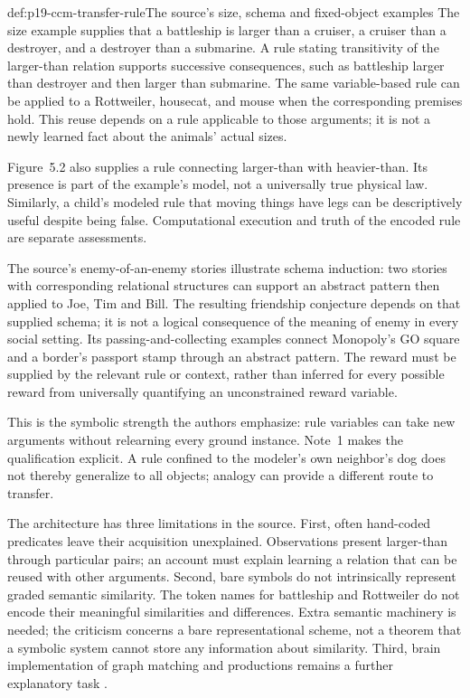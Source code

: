 \begin{hbexample}{def:p19-ccm-transfer-rule}{The source's size, schema and fixed-object examples}
The size example supplies that a battleship is larger than a cruiser,
a cruiser than a destroyer, and a destroyer than a submarine. A rule
stating transitivity of the larger-than relation supports successive
consequences, such as battleship larger than destroyer and then larger
than submarine. The same variable-based rule can be applied to a
Rottweiler, housecat, and mouse when the corresponding premises hold.
This reuse depends on a rule applicable to those arguments; it is not
a newly learned fact about the animals' actual sizes.

Figure~5.2 also supplies a rule connecting larger-than with heavier-than.
Its presence is part of the example's model, not a universally true
physical law. Similarly, a child's modeled rule that moving things have
legs can be descriptively useful despite being false. Computational
execution and truth of the encoded rule are separate assessments.

The source's enemy-of-an-enemy stories illustrate schema induction:
two stories with corresponding relational structures can support an
abstract pattern then applied to Joe, Tim and Bill. The resulting
friendship conjecture depends on that supplied schema; it is not a
logical consequence of the meaning of enemy in every social setting.
Its passing-and-collecting examples connect Monopoly's GO square and
a border's passport stamp through an abstract pattern. The reward must
be supplied by the relevant rule or context, rather than inferred for
every possible reward from universally quantifying an unconstrained
reward variable.
\end{hbexample}

This is the symbolic strength the authors emphasize: rule variables
can take new arguments without relearning every ground instance.
Note~1 makes the qualification explicit. A rule confined to the
modeler's own neighbor's dog does not thereby generalize to all objects;
analogy can provide a different route to transfer.

The architecture has three limitations in the source. First, often
hand-coded predicates leave their acquisition unexplained. Observations
present larger-than through particular pairs; an account must explain
learning a relation that can be reused with other arguments. Second,
bare symbols do not intrinsically represent graded semantic similarity.
The token names for battleship and Rottweiler do not encode their
meaningful similarities and differences. Extra semantic machinery is
needed; the criticism concerns a bare representational scheme, not a
theorem that a symbolic system cannot store any information about
similarity. Third, brain implementation of graph matching and productions
remains a further explanatory task
\parencite[pp.~54--55 and p.~64, n.~1]{DoumasHummel2012HigherCognition}.

